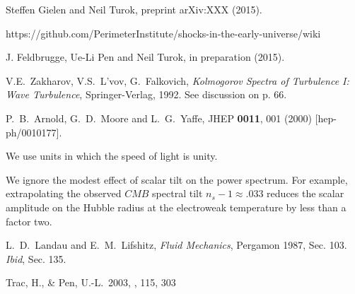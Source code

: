 \documentclass[prl,aps,10pt,twocolumn,showkeys,nofootinbib]{revtex4-1}
\begin{document}
\begin{thebibliography}{99}

 Steffen Gielen and Neil Turok, preprint arXiv:XXX (2015). 

 https://github.com/PerimeterInstitute/shocks-in-the-early-universe/wiki



 J. Feldbrugge, Ue-Li Pen and Neil Turok, in preparation (2015). 

 V.E.~Zakharov, V.S.~L'vov, G.~Falkovich, {\em Kolmogorov Spectra of Turbulence I: Wave Turbulence}, Springer-Verlag, 1992. See discussion on p. 66.



  P.~B.~Arnold, G.~D.~Moore and L.~G.~Yaffe,
  JHEP {\bf 0011}, 001 (2000)
  [hep-ph/0010177].

 We use units in which the speed of light is unity. 

 We ignore the modest effect of scalar tilt on the power spectrum. For example, extrapolating the observed $CMB$ spectral tilt $n_s-1\approx .033$ reduces the scalar amplitude on the Hubble radius at the electroweak temperature by less than a factor two. 


 L.~D.~Landau and E.~M.~Lifshitz, {\it Fluid Mechanics}, Pergamon 1987, Sec. 103. 
 {\it Ibid}, Sec. 135. 


 Trac, H., \& Pen, U.-L.\ 2003, \pasp, 115, 303 




\end{thebibliography}
\end{document}
